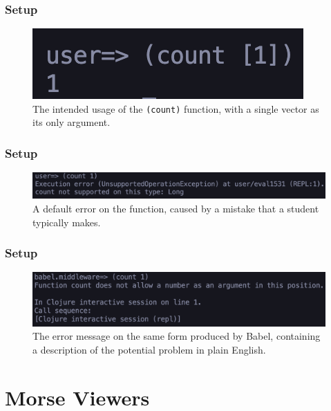 \documentclass{beamer}
\begin{document}
\begin{frame}
    \frametitle{Setup}
    \begin{figure}
        \centering
        \includegraphics[width=\textwidth]{../resources/CountIntendedUse.png}
        \caption{The intended usage of the \texttt{(count)} function, with a single vector as its only argument.}
        \label{fig:defaultclj}
    \end{figure}
\end{frame}

\begin{frame}
    \frametitle{Setup}
    \begin{figure}
        \centering
        \includegraphics[width=\textwidth]{../resources/CountError.png}
        \caption{A default error on the  function, caused by a mistake that a student typically makes.}
        \label{fig:defaultclj}
    \end{figure}
\end{frame}

\begin{frame}
    \frametitle{Setup}
    \begin{figure}
        \centering
        \includegraphics[width=\textwidth]{../resources/CountBabelError.png}
        \caption{The error message on the same form produced by Babel, containing a description of the potential problem in plain English.}
        \label{fig:defaultclj}
    \end{figure}
\end{frame}

\section{Morse Viewers}
\end{document}
